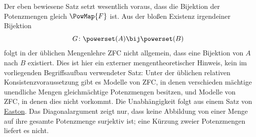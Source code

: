 \documentclass[main.tex]{subfiles}
\begin{document}
\begin{tabproofsplit}

\closeproofpart

  \setcounter{proofstepnr}{5}%

\closeproofpart

  \setcounter{proofstepnr}{6}%

\closeproofpart
\end{tabproofsplit}

\begin{remark}
Der eben bewiesene Satz setzt wesentlich voraus, dass die Bijektion der
Potenzmengen gleich \(\PowMap{F}\) ist.  Aus der bloßen Existenz irgendeiner
Bijektion
\[
  G\colon\powerset(A)\bij\powerset(B)
\]
folgt in der üblichen Mengenlehre ZFC nicht allgemein, dass eine Bijektion von
\(A\) nach \(B\) existiert.  Dies ist hier ein externer mengentheoretischer
Hinweis, kein im vorliegenden Begriffsaufbau verwendeter Satz: Unter der
üblichen relativen Konsistenzvoraussetzung gibt es Modelle von ZFC, in denen
verschieden mächtige unendliche Mengen gleichmächtige Potenzmengen besitzen,
und Modelle von ZFC, in denen dies nicht vorkommt.  Die Unabhängigkeit folgt
aus einem Satz von
\href{https://doi.org/10.1016/0003-4843(70)90012-4}{Easton}.  Das
Diagonalargument zeigt nur, dass keine Abbildung von einer Menge auf ihre
gesamte Potenzmenge surjektiv ist; eine Kürzung zweier Potenzmengen liefert es
nicht.
\end{remark}
\end{document}
